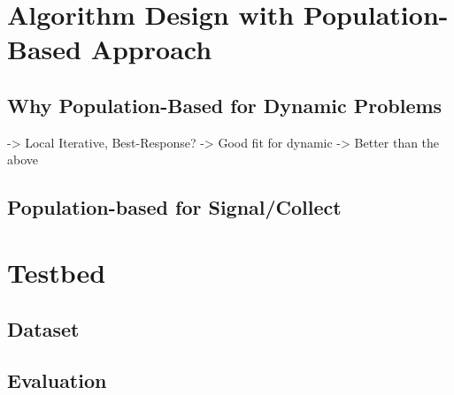 \section{Algorithm Design with Population-Based Approach}
\subsection{Why Population-Based for Dynamic Problems}
-> Local Iterative, Best-Response?
-> Good fit for dynamic
-> Better than the above
\subsection{Population-based for Signal/Collect}

\section{Testbed}
\subsection{Dataset}
\subsection{Evaluation}
